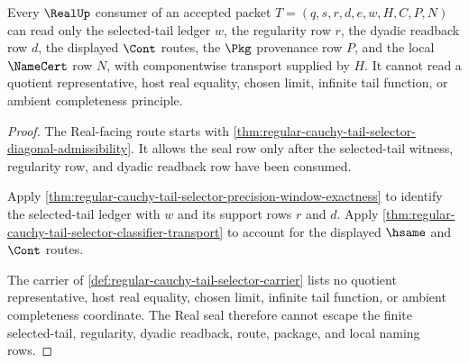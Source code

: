 \begin{theorem}
\label{thm:regular-cauchy-tail-selector-real-seal-nonescape}
\label{thm:reg-cauchy-tail-sel-real-handoff}
Every $\RealUp$ consumer of an accepted packet $T=(q,s,r,d,e,w,H,C,P,N)$ can read only the selected-tail ledger $w$, the regularity row $r$, the dyadic readback row $d$, the displayed $\Cont$ routes, the $\Pkg$ provenance row $P$, and the local $\NameCert$ row $N$, with componentwise transport supplied by $H$. It cannot read a quotient representative, host real equality, chosen limit, infinite tail function, or ambient completeness principle.
\end{theorem}
\begin{proof}
The Real-facing route starts with \autoref{thm:regular-cauchy-tail-selector-diagonal-admissibility}. It allows the seal row only after the selected-tail witness, regularity row, and dyadic readback row have been consumed.

Apply \autoref{thm:regular-cauchy-tail-selector-precision-window-exactness} to identify the selected-tail ledger with $w$ and its support rows $r$ and $d$. Apply \autoref{thm:regular-cauchy-tail-selector-classifier-transport} to account for the displayed $\hsame$ and $\Cont$ routes.

The carrier of \autoref{def:regular-cauchy-tail-selector-carrier} lists no quotient representative, host real equality, chosen limit, infinite tail function, or ambient completeness coordinate. The Real seal therefore cannot escape the finite selected-tail, regularity, dyadic readback, route, package, and local naming rows.
\end{proof}

